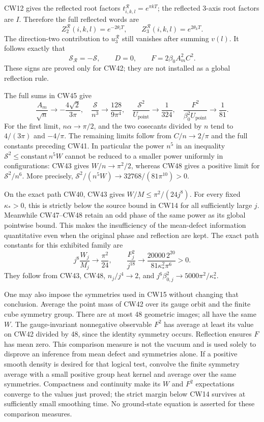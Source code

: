 \documentclass[11pt]{article}
\begin{document}
CW12 gives the reflected root factors
\(t^{\mathcal R}_{i,k,l}=e^{\pi kT}\); the reflected 3-axis
root factors are \(I\). Therefore the full reflected words are
\[
 Z_2^{\mathcal R}(i,k,l)=e^{-2\theta_iT},\qquad
 Z_3^{\mathcal R}(i,k,l)=e^{2\theta_kT}.
\]
The direction-two contribution to \(u_3^{\mathcal R}\) still
vanishes after summing \(v(l)\). It follows exactly that
\[
 \mathcal S_{\mathcal R}=-\mathcal S,\qquad
 D=0,\qquad F=2\beta_0A_m^2C^2.                           \tag{CW47}
\]
These signs are proved only for CW42; they are not installed
as a global reflection rule.

The full sums in CW45 give
\[
 \frac{A_m}{\sqrt n}\longrightarrow-\frac{4\sqrt2}{3\pi},
 \quad \frac{\mathcal S}{n^3}\longrightarrow\frac{128}{9\pi^4},
 \quad \frac{\mathcal S^2}{U_{\mathrm{point}}}\longrightarrow\frac1{324},
 \quad \frac{F^2}{\beta_0^2U_{\mathrm{point}}}\longrightarrow\frac1{81}.
                                                               \tag{CW48}
\]
For the first limit, \(n\alpha\to\pi/2\), and the two cosecants
divided by \(n\) tend to \(4/(3\pi)\) and \(-4/\pi\).
The remaining limits follow from \(C/n\to2/\pi\) and the
full constants preceding CW41. In particular the power \(n^5\)
in an inequality \(\mathcal S^2\le\mathrm{constant}\,n^5W\)
cannot be reduced to a smaller power uniformly in configurations:
CW43 gives \(W/n\to\pi^2/2\), whereas CW48 gives a positive
limit for \(\mathcal S^2/n^6\). More precisely,
\(\mathcal S^2/(n^5W)\to32768/(81\pi^{10})>0\).

On the exact path CW40, CW43 gives
\(W/M\le\pi^2/(24j^8)\). For every fixed \(\kappa_*>0\),
this is strictly below the source bound in CW14 for all
sufficiently large \(j\). Meanwhile CW47–CW48 retain an odd
phase of the same power as its global pointwise bound.
This makes the insufficiency of the mean-defect information
quantitative even when the original phase and reflection are kept.
The exact path constants for this exhibited family are
\[
 j^8\frac{W_j}{M_j}\longrightarrow\frac{\pi^2}{24},\qquad
 \frac{F_j^2}{j^{18}}\longrightarrow
       \frac{20000\,2^{20}}{81\kappa_*^2\pi^6}>0.          \tag{CW49}
\]
They follow from CW43, CW48, \(n_j/j^4\to2\), and
\(j^6\beta_{0,j}^2\to5000\pi^2/\kappa_*^2\).

One may also impose the symmetries used in CW15 without changing
that conclusion. Average the point mass of CW42 over its gauge
orbit and the finite cube symmetry group. There are at most
48 geometric images; all have the same \(W\). The gauge-invariant
nonnegative observable \(F^2\) has average at least its value
on CW42 divided by 48, since the identity symmetry occurs.
Reflection ensures \(F\) has mean zero. This comparison measure
is not the vacuum and is used solely to disprove an inference
from mean defect and symmetries alone. If a positive smooth
density is desired for that logical test, convolve the finite
symmetry average with a small positive group heat kernel and
average over the same symmetries. Compactness and continuity
make its \(W\) and \(F^2\) expectations converge to the values
just proved; the strict margin below CW14 survives at sufficiently
small smoothing time. No ground-state equation is asserted for
these comparison measures.
\end{document}
